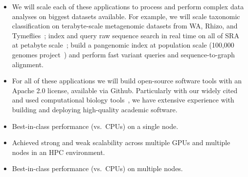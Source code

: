\begin{itemize}[noitemsep]
  \item We will scale each of these applications to process and perform complex data analyses on biggest datasets available. For example, we will scale taxonomic classification on terabyte-scale metagenomic datasets from WA, Rhizo, and Tymeflies~\cite{hofmeyr2020terabase}; index and query raw sequence search in real time on all of SRA at petabyte scale~\cite{kodama2012sequence}; build a pangenomic index at population scale (100,000 genomes project~\cite{1002021100}) and perform fast variant queries and sequence-to-graph alignment.
  \item For all of these applications we will build open-source software tools with an Apache 2.0 license, available via Github. Particularly with our widely cited and used computational biology tools~\cite{PandeyABFJP18Cell,PandeyBJP17a,PandeyBJP17b,PandeyBJP17,pandey2020timely,pandey2021variantstore,pandey2021terrace,pandey2022iceberght}, we have extensive experience with building and deploying high-quality academic software.
  \item Best-in-class performance (vs.\ CPUs) on a single node.
  \item Achieved strong and weak scalability across multiple GPUs and multiple nodes in an HPC environment. 
  \item Best-in-class performance (vs.\ CPUs) on multiple nodes.
\end{itemize}
